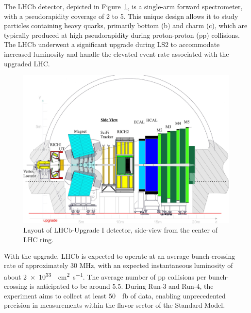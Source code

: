 The LHCb detector, depicted in Figure~\ref{fig:lhcb-detector}, is a single-arm forward spectrometer, with a pseudorapidity coverage of 2 to 5. This unique design allows it to study particles containing heavy quarks, primarily bottom (b) and charm (c), which are typically produced at high pseudorapidity during proton-proton (pp) collisions. The LHCb underwent a significant upgrade during LS$2$ to accommodate increased luminosity and handle the elevated event rate associated with the upgraded LHC.
\begin{figure}[h]
    \centering
    \includegraphics[width=\textwidth]{figures/UT-upgrade-detector-scaled.jpeg}
    \caption{Layout of LHCb-Upgrade I detector, side-view from the center of LHC ring.}
    \label{fig:lhcb-detector}
\end{figure}
With the upgrade, LHCb is expected to operate at an average bunch-crossing rate of approximately 30 MHz, with an expected instantaneous luminosity of about \SI{2e33}{\per\centi\meter\squared\per\second}. The average number of pp collisions per bunch-crossing is anticipated to be around 5.5. During Run-3 and Run-4, the experiment aims to collect at least \SI{50}{\per\femto\barn} of data, enabling unprecedented precision in measurements within the flavor sector of the Standard Model.

